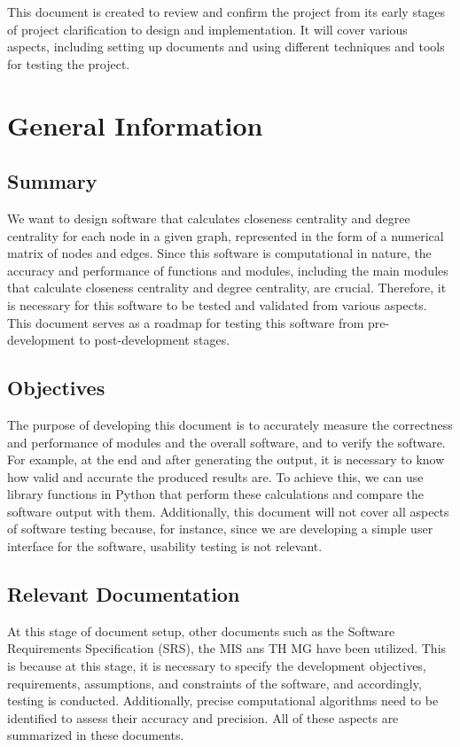 \documentclass[12pt, titlepage]{article}
\begin{document}
\newpage



This document is created to review and confirm the project from its early stages of project clarification to design and implementation. It will cover various aspects, including setting up documents and using different techniques and tools for testing the project.

\section{General Information}

\subsection{Summary}

We want to design software that calculates closeness centrality and degree centrality for each node in a given graph, represented in the form of a numerical matrix of nodes and edges. Since this software is computational in nature, the accuracy and performance of functions and modules, including the  main modules that calculate closeness centrality and degree centrality, are crucial. Therefore, it is necessary for this software to be tested and validated from various aspects. This document serves as a roadmap for testing this software from pre-development to post-development stages.
\subsection{Objectives}

The purpose of developing this document is to accurately measure the correctness and performance of modules and the overall software, and to verify the software. For example, at the end and after generating the output, it is necessary to know how valid and accurate the produced results are. To achieve this, we can use library functions in Python that perform these calculations and compare the software output with them. Additionally, this document will not cover all aspects of software testing because, for instance, since we are developing a simple  user interface for the software, usability testing is not relevant.

\subsection{Relevant Documentation}

At this stage of document setup, other documents such as the Software Requirements Specification (SRS),  the MIS ans TH MG have been utilized. This is because at this stage, it is necessary to specify the development objectives, requirements, assumptions, and constraints of the software, and accordingly, testing is conducted. Additionally, precise computational algorithms need to be identified to assess their accuracy and precision. All of these aspects are summarized in these documents.
\end{document}
